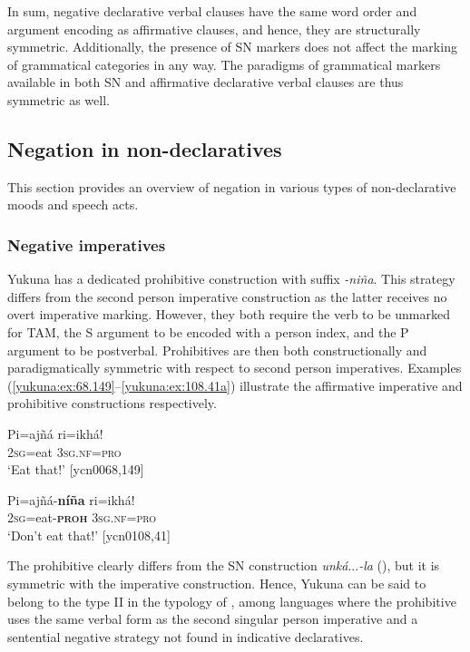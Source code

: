 \documentclass[output=paper,colorlinks,citecolor=brown]{langscibook}
\begin{document}
In sum, negative declarative verbal clauses have the same word order and argument encoding as affirmative clauses, and hence, they are structurally symmetric. Additionally, the presence of SN markers does not affect the marking of grammatical categories in any way. The paradigms of grammatical markers available in both SN and affirmative declarative verbal clauses are thus symmetric as well. 

\subsection{Negation in non-declaratives}\label{yukuna:ndecl}

This section provides an overview of negation in various types of non-declarative moods and speech acts. 

\subsubsection{Negative imperatives}

Yukuna has a dedicated prohibitive construction with suffix \textit{-niña}. This strategy differs from the second person imperative construction as the latter receives no overt imperative marking. However, they both require the verb to be unmarked for TAM, the S argument to be encoded with a person index, and the P argument to be postverbal. Prohibitives are then both constructionally and paradigmatically symmetric with respect to second person imperatives. Examples (\ref{yukuna:ex:68.149}--\ref{yukuna:ex:108.41a}) illustrate the affirmative imperative and prohibitive constructions respectively. 

\ea\label{yukuna:ex:68.149}
\gll Pi=ajñá ri=ikhá!\\
\textsc{2sg}=eat \textsc{3sg.nf}=\textsc{pro} \\
\glt ‘Eat that!’ [ycn0068,149]
\z

\ea\label{yukuna:ex:108.41a}
\gll  Pi=ajñá-\textbf{níña} ri=ikhá!\\
\textsc{2sg}=eat-\textbf{\textsc{proh}} \textsc{3sg.nf}=\textsc{pro}\\
\glt ‘Don't eat that!’ [ycn0108,41]
\z

The prohibitive clearly differs from the SN construction \mbox{\textit{unká}}{...}\mbox{\textit{-la}} (), but it is symmetric with the imperative construction. Hence, Yukuna can be said to belong to the type II in the typology of \citet{AuweraEtAl2013},  among languages where the prohibitive uses the same verbal form as the second singular person imperative and a sentential negative strategy not found in indicative declaratives. 
\end{document}
